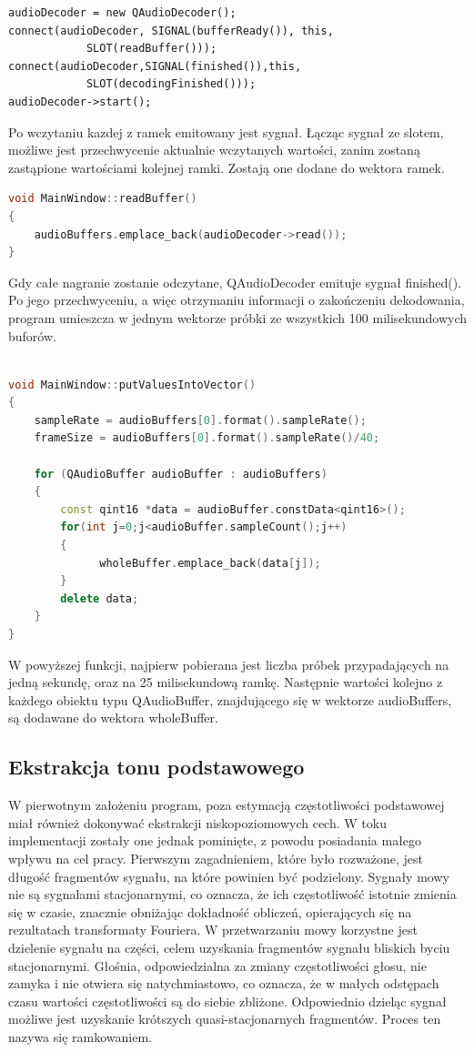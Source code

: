 \documentclass[a4paper,12 pt]{article}
\begin{document}
\begin{lstlisting}
audioDecoder = new QAudioDecoder();
connect(audioDecoder, SIGNAL(bufferReady()), this, 
			SLOT(readBuffer()));
connect(audioDecoder,SIGNAL(finished()),this,
			SLOT(decodingFinished()));
audioDecoder->start();
\end{lstlisting}
Po wczytaniu kazdej z ramek emitowany jest sygnał. Łącząc sygnał ze slotem, możliwe jest przechwycenie aktualnie wczytanych wartości, zanim zostaną zastąpione wartościami kolejnej ramki.
Zostają one dodane do wektora ramek.
\begin{lstlisting}[caption={Funkcja przechwytująca wczytany fragment},label={lst:label},language=C++]
void MainWindow::readBuffer()
{
    audioBuffers.emplace_back(audioDecoder->read());
}
\end{lstlisting}
Gdy całe nagranie zostanie odczytane, QAudioDecoder emituje sygnał finished(). Po jego przechwyceniu, a więc otrzymaniu informacji o zakończeniu dekodowania, program umieszcza w jednym wektorze próbki ze wszystkich 100 milisekundowych buforów.

\begin{lstlisting}[caption={Funkcja dodająca do wektora wszystkie odczytane próbki},label={lst:label},language=C++]

void MainWindow::putValuesIntoVector()
{
    sampleRate = audioBuffers[0].format().sampleRate();
    frameSize = audioBuffers[0].format().sampleRate()/40;
    
    for (QAudioBuffer audioBuffer : audioBuffers)
    {
        const qint16 *data = audioBuffer.constData<qint16>();
        for(int j=0;j<audioBuffer.sampleCount();j++)
        {
              wholeBuffer.emplace_back(data[j]);
        }
        delete data;
    }
}
\end{lstlisting}
W powyższej funkcji, najpierw pobierana jest liczba próbek przypadających na jedną sekundę, oraz na 25 milisekundową ramkę. Następnie wartości kolejno z każdego obiektu typu QAudioBuffer, znajdującego się w wektorze audioBuffers, są dodawane do wektora wholeBuffer.

\subsection{Ekstrakcja tonu podstawowego}
W pierwotnym założeniu program, poza estymacją częstotliwości podstawowej miał również dokonywać ekstrakcji niskopoziomowych cech.
W toku implementacji zostały one jednak pominięte, z powodu posiadania małego wpływu na cel pracy. 
Pierwszym zagadnieniem, które było rozważone, jest długość fragmentów sygnału, na które powinien być podzielony.
Sygnały mowy nie są sygnalami stacjonarnymi, co oznacza, że ich częstotliwość istotnie zmienia się w czasie, znacznie obniżając dokładność obliczeń, opierających się na rezultatach transformaty Fouriera.
W przetwarzaniu mowy korzystne jest dzielenie sygnału na części, celem uzyskania fragmentów sygnału bliskich byciu stacjonarnymi.
Głośnia, odpowiedzialna za zmiany częstotliwości głosu, nie zamyka i nie otwiera się natychmiastowo, co oznacza, że w małych odstępach czasu wartości częstotliwości są do siebie zbliżone.
Odpowiednio dzieląc sygnał możliwe jest uzyskanie krótszych  quasi-stacjonarnych fragmentów. Proces ten nazywa się ramkowaniem.
\end{document}
